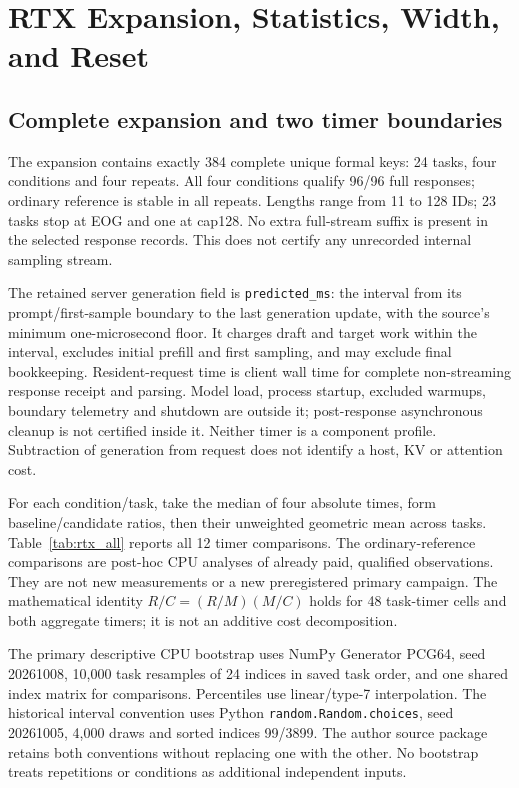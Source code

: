 \section{RTX Expansion, Statistics, Width, and Reset}
\label{supp:rtx_cost}
\subsection{Complete expansion and two timer boundaries}
\label{supp:rtx_expansion}
The expansion contains exactly 384 complete unique formal keys: 24 tasks, four conditions and four repeats. All four conditions qualify 96/96 full responses; ordinary reference is stable in all repeats. Lengths range from 11 to 128 IDs; 23 tasks stop at EOG and one at cap128. No extra full-stream suffix is present in the selected response records. This does not certify any unrecorded internal sampling stream.

The retained server generation field is \texttt{predicted\_ms}: the interval from its prompt/first-sample boundary to the last generation update, with the source's minimum one-microsecond floor. It charges draft and target work within the interval, excludes initial prefill and first sampling, and may exclude final bookkeeping. Resident-request time is client wall time for complete non-streaming response receipt and parsing. Model load, process startup, excluded warmups, boundary telemetry and shutdown are outside it; post-response asynchronous cleanup is not certified inside it. Neither timer is a component profile. Subtraction of generation from request does not identify a host, KV or attention cost.

For each condition/task, take the median of four absolute times, form baseline/candidate ratios, then their unweighted geometric mean across tasks. Table~\ref{tab:rtx_all} reports all 12 timer comparisons. The ordinary-reference comparisons are post-hoc CPU analyses of already paid, qualified observations. They are not new measurements or a new preregistered primary campaign. The mathematical identity $R/C=(R/M)(M/C)$ holds for 48 task-timer cells and both aggregate timers; it is not an additive cost decomposition.



The primary descriptive CPU bootstrap uses NumPy Generator PCG64, seed 20261008, 10,000 task resamples of 24 indices in saved task order, and one shared index matrix for comparisons. Percentiles use linear/type-7 interpolation. The historical interval convention uses Python \texttt{random.Random.choices}, seed 20261005, 4,000 draws and sorted indices 99/3899. The author source package retains both conventions without replacing one with the other. No bootstrap treats repetitions or conditions as additional independent inputs.


